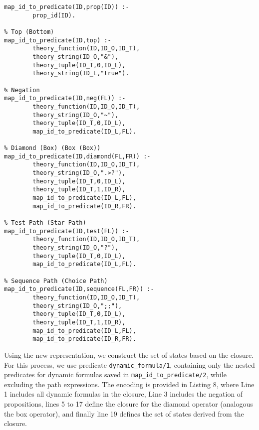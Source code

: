 \begin{center}
    \begin{lstlisting}[] 
% Proposition
map_id_to_predicate(ID,prop(ID)) :- 
        prop_id(ID).

% Top (Bottom)
map_id_to_predicate(ID,top) :-                                                        
        theory_function(ID,ID_O,ID_T), 
        theory_string(ID_O,"&"),
        theory_tuple(ID_T,0,ID_L),
        theory_string(ID_L,"true").

% Negation
map_id_to_predicate(ID,neg(FL)) :-                                                        
        theory_function(ID,ID_O,ID_T), 
        theory_string(ID_O,"~"),
        theory_tuple(ID_T,0,ID_L),
        map_id_to_predicate(ID_L,FL).

% Diamond (Box) (Box (Box))
map_id_to_predicate(ID,diamond(FL,FR)) :-
        theory_function(ID,ID_O,ID_T),
        theory_string(ID_O,".>?"),
        theory_tuple(ID_T,0,ID_L),
        theory_tuple(ID_T,1,ID_R),
        map_id_to_predicate(ID_L,FL), 
        map_id_to_predicate(ID_R,FR).

% Test Path (Star Path)
map_id_to_predicate(ID,test(FL)) :-                                                   
        theory_function(ID,ID_O,ID_T), 
        theory_string(ID_O,"?"),
        theory_tuple(ID_T,0,ID_L),
        map_id_to_predicate(ID_L,FL).

% Sequence Path (Choice Path)
map_id_to_predicate(ID,sequence(FL,FR)) :-                                                   
        theory_function(ID,ID_O,ID_T), 
        theory_string(ID_O,";;"),
        theory_tuple(ID_T,0,ID_L),
        theory_tuple(ID_T,1,ID_R),
        map_id_to_predicate(ID_L,FL), 
        map_id_to_predicate(ID_R,FR).
\end{lstlisting}
\end{center}


Using the new representation, we construct the set of states based on the closure.
For this process, we use predicate \texttt{dynamic\_formula/1}, containing only the nested predicates for dynamic formulas saved in \texttt{map\_id\_to\_predicate/2}, while excluding the path expressions. The encoding is provided in Listing 8, where Line 1 includes all dynamic formulas in the closure, Line 3 includes the negation of propositions, lines 5 to 17 define the closure for the diamond operator (analogous the box operator), and finally line 19 defines the set of states derived from the closure. 

